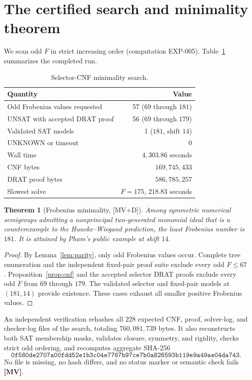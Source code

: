 \documentclass[11pt]{article}
\newtheorem{theorem}{Theorem}[section]
\theoremstyle{definition}
\theoremstyle{remark}
\begin{document}
\section{The certified search and minimality theorem}

We scan odd $F$ in strict increasing order (computation EXP-005). Table~\ref{tab:search}
summarizes the completed run.

\begin{table}[ht]
\centering
\caption{Selector-CNF minimality search.}
\label{tab:search}
\begin{tabular}{lr}
\toprule
Quantity & Value\\
\midrule
Odd Frobenius values requested & 57 ($69$ through $181$)\\
UNSAT with accepted DRAT proof & 56 ($69$ through $179$)\\
Validated SAT models & 1 ($181$, shift $14$)\\
UNKNOWN or timeout & 0\\
Wall time & $4{,}303.86$ seconds\\
CNF bytes & $169{,}745{,}433$\\
DRAT proof bytes & $586{,}785{,}257$\\
Slowest solve & $F=175$, $218.83$ seconds\\
\bottomrule
\end{tabular}
\end{table}

\begin{theorem}[Frobenius minimality, {[MV+D]}]\label{thm:minimal}
Among symmetric numerical semigroups admitting a nonprincipal two-generated monomial ideal that is
a counterexample to the Huneke--Wiegand prediction, the least Frobenius number is $181$. It is
attained by Pham's public example at shift $14$.
\end{theorem}
\begin{proof}
By Lemma~\ref{lem:parity}, only odd Frobenius values occur. Complete tree enumeration and the
independent fixed-pair proof suite exclude every odd $F\le67$. Proposition~\ref{prop:cnf} and the
accepted selector DRAT proofs exclude every odd $F$ from $69$ through $179$. The validated
selector and fixed-pair models at $(181,14)$ provide existence. These cases exhaust all smaller
positive Frobenius values.
\end{proof}

An independent verification rehashes all $228$ expected CNF, proof, solver-log, and checker-log
files of the search, totaling $760{,}081{,}739$ bytes. It also reconstructs both SAT membership
masks, validates closure, symmetry, and rigidity, checks strict odd ordering, and recomputes
aggregate SHA-256
\[
\texttt{0f580de2707a00fdd52e1b3c04e7767b97ce7b0a826593b119e9a49ae04da743}.
\]
No file is missing, no hash differs, and no status marker or semantic check fails \textbf{[MV]}.
\end{document}
